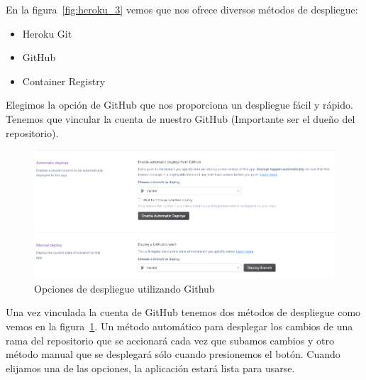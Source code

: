En la figura~\ref{fig:heroku_3} vemos que nos ofrece diversos métodos de despliegue:
\begin{itemize}
    \item Heroku Git
    \item GitHub
    \item Container Registry
\end{itemize}
Elegimos la opción de GitHub que nos proporciona un despliegue fácil y rápido. Tenemos que vincular la cuenta de nuestro GitHub (Importante ser el dueño del repositorio).
\begin{figure}[H]
    \centering
    \includegraphics[width=6in]{figures/chapter-4/heroku_4.png}
    \caption{Opciones de despliegue utilizando Github}
    \label{fig:heroku_4}
\end{figure}
Una vez vinculada la cuenta de GitHub tenemos dos métodos de despliegue como vemos en la figura~\ref{fig:heroku_4}. Un método automático para desplegar los cambios de una rama del repositorio que se accionará cada vez que subamos cambios y otro método manual que se desplegará sólo cuando presionemos el botón. 
Cuando elijamos una de las opciones, la aplicación estará lista para usarse.